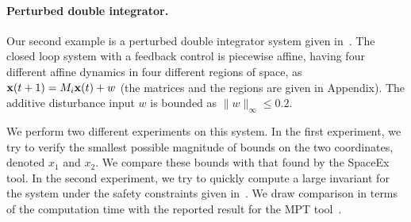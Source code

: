 \paragraph{Perturbed double integrator.}
Our second example is a perturbed double integrator system given
in~\cite{rakovic2004computation}.  The closed loop system with a
feedback control is piecewise affine, having four different affine
dynamics in four different regions of space, as
${\bf x}(t+1)=M_i{\bf x}(t)+w$ (the matrices and the regions are given in Appendix).
%
The additive disturbance input $w$ is bounded as $\|w\|_{\infty}\leq
0.2$.  

We perform two different experiments on this system.  In the first
experiment, we try to verify the smallest possible magnitude of bounds
on the two coordinates, denoted $x_1$ and $x_2$. We compare these
bounds with that found by the SpaceEx tool.  In the second experiment,
we try to quickly compute a large invariant for the system under the
safety constraints given in~\cite{rakovic2004computation}.  %
We draw comparison in terms of the computation time with
the reported result for the MPT tool~\cite{rakovic2004computation}.

